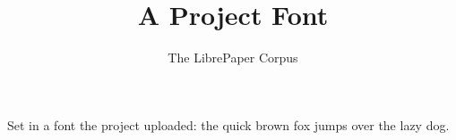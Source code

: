 \documentclass[11pt]{article}
\title{A Project Font}
\author{The LibrePaper Corpus}
\date{}
\begin{document}
\maketitle

Set in a font the project uploaded: the quick brown fox jumps over the lazy dog.
\end{document}

